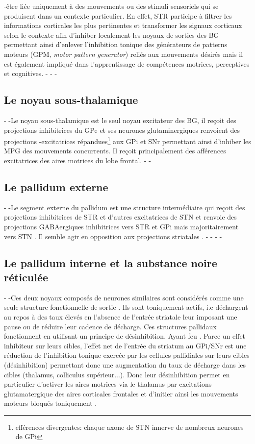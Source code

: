 -être liée uniquement à des mouvements ou des stimuli sensoriels qui se produisent dans un contexte particulier. En effet, STR participe à filtrer les informations corticales les plus pertinentes et transformer les signaux corticaux selon le contexte afin d'inhiber localement les noyaux de sorties des BG permettant ainsi d'enlever l'inhibition tonique des générateurs de patterns moteurs (GPM, \textit{motor pattern generator}) reliés aux mouvements désirés mais il est également impliqué dans l'apprentissage de compétences motrices, perceptives et cognitives\citep{Joel:1994, Suzuki:2001}. 
- 
-
-\subsection{Le noyau sous-thalamique}
-
-Le noyau sous-thalamique est le seul noyau excitateur des BG, il re\c coit des projections inhibitrices du GPe et ses neurones glutaminergiques renvoient des projections
-excitatrices répandues\footnote{efférences divergentes: chaque axone de STN innerve de nombreux neurones de GPi} aux GPi et SNr \citep{Parent:1993} permettant ainsi d'inhiber les MPG des mouvements concurrents. Il reçoit principalement des afférences excitatrices des aires motrices du lobe frontal.
-
-\subsection{Le pallidum externe}
-
-Le segment externe du pallidum est une structure intermédiaire qui reçoit des projections inhibitrices de STR et d'autres excitatrices de STN et renvoie des projections GABAergiques inhibitrices vers STR et GPi mais majoritairement vers STN \citep{Rouzaire:1980}. Il semble agir en opposition aux projections striatales \citep{Alexander:1990}.
- 
-
-
-\subsection{Le pallidum interne et la substance noire réticulée}
-
-Ces deux noyaux composés de neurones similaires sont considérés comme une seule structure fonctionnelle de sortie \citep {Carpenter:1981}. Ils sont toniquement actifs, i.e déchargent au repos à des taux élevés en l'absence de l'entrée striatale leur imposant une pause ou de réduire leur cadence de décharge. Ces structures pallidaux fonctionnent en utilisant un principe de désinhibition. Ayant feu . Parce un effet inhibiteur sur leurs cibles, l'effet net de l'entrée du striatum au GPi/SNr est une réduction de l'inhibition tonique exercée par les cellules pallidiales sur leurs cibles (désinhibition) permettant donc une augmentation du taux de décharge dans les cibles (thalamus, colliculus supérieur...). Donc leur désinhibition permet en particulier d'activer les aires motrices via le thalamus par excitations glutamatergique des aires corticales frontales et d'initier ainsi les mouvements moteurs bloqués toniquement \citep{Nauta:1966}. 
